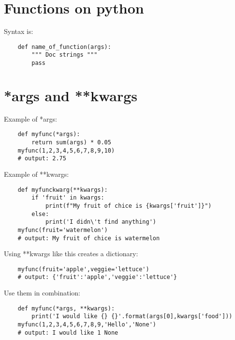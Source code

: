 \section{Functions on python}
Syntax is: 
\begin{verbatim}
    def name_of_function(args):
        """ Doc strings """
        pass
\end{verbatim}


\section{*args and **kwargs}
Example of *args: 
\begin{verbatim}
    def myfunc(*args):
        return sum(args) * 0.05
    myfunc(1,2,3,4,5,6,7,8,9,10)
    # output: 2.75
\end{verbatim}

Example of **kwargs: 
\begin{verbatim}
    def myfunckwarg(**kwargs):
        if 'fruit' in kwargs: 
            print(f"My fruit of chice is {kwargs['fruit']}")
        else: 
            print('I didn\'t find anything')
    myfunc(fruit='watermelon')
    # output: My fruit of chice is watermelon
\end{verbatim}

Using **kwargs like this creates a dictionary: 
\begin{verbatim}
    myfunc(fruit='apple',veggie='lettuce')
    # output: {'fruit':'apple','veggie':'lettuce'}
\end{verbatim}

Use them in combination: 
\begin{verbatim}
    def myfunc(*args, **kwargs): 
        print('I would like {} {}'.format(args[0],kwargs['food']))
    myfunc(1,2,3,4,5,6,7,8,9,'Hello','None') 
    # output: I would like 1 None
\end{verbatim}


